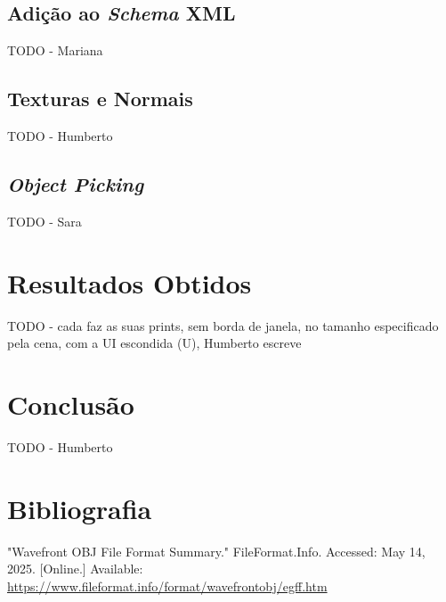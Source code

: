 \documentclass[12pt, a4paper]{article}
\begin{document}
\subsection{Adição ao \emph{Schema} XML}

{\color{red} TODO - Mariana}

\subsection{Texturas e Normais}

{\color{red} TODO - Humberto}

\subsection{\emph{Object Picking}}

{\color{red} TODO - Sara}

\section{Resultados Obtidos}

{\color{red} TODO - cada faz as suas prints, sem borda de janela, no tamanho especificado pela cena,
com a UI escondida (U), Humberto escreve}

\section{Conclusão}

{\color{red} TODO - Humberto}

\begingroup
\section{Bibliografia}
\renewcommand{\section}[2]{}

\begin{thebibliography}{9}
        "Wavefront OBJ File Format Summary."{} FileFormat.Info. Accessed: May 14, 2025. [Online.]
        Available: \url{https://www.fileformat.info/format/wavefrontobj/egff.htm}
\end{thebibliography}
\endgroup
\end{document}
